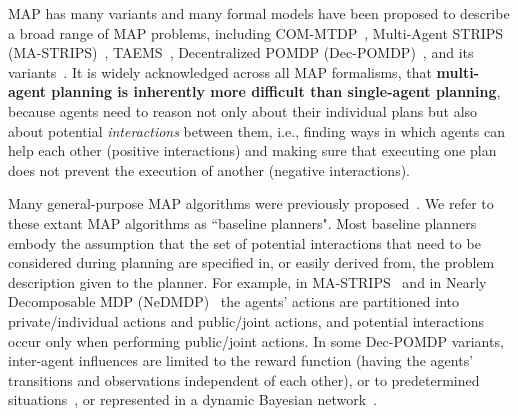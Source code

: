 \documentclass[11pt]{article}
\begin{document}
MAP has many variants and many formal models have been proposed to describe a broad range of MAP problems, including COM-MTDP~\cite{pynadath2002communicative}, Multi-Agent STRIPS (MA-STRIPS)~\cite{brafman2013complexity}, TAEMS~\cite{Horling-182,lesser2004evolution}, Decentralized POMDP (Dec-POMDP)~\cite{bernstein2002complexity}, and its variants~\cite{becker2004decentralized,roth2007exploiting,oliehoek2012influenceBased}. It is widely acknowledged across all MAP formalisms, that {\bf multi-agent planning is inherently more difficult than single-agent planning}, because agents need to reason not only about their individual plans but also about potential {\em interactions} between them, i.e., finding ways in which agents can help each other (positive interactions) and making sure that executing one plan does not prevent the execution of another (negative interactions).


Many general-purpose MAP algorithms were previously proposed~\cite{torreno2014fmap,nair2005networked,witwicki2010influence,spaan2011scaling,oliehoek2012influenceBased,wu2013monte,dibangoye2014exploiting,nissim2014distributed}. We refer to these extant MAP algorithms as ``baseline planners". 
Most baseline planners embody the assumption that the set of potential interactions that need to be considered during planning are specified in, or easily derived from, the problem description given to the planner. For example, in MA-STRIPS~\cite{brafman2013complexity} and in Nearly Decomposable MDP (NeDMDP)~\cite{kamar2013modeling} the agents' actions are partitioned into private/individual actions and public/joint actions, and potential interactions occur only when performing public/joint actions. In some Dec-POMDP variants, inter-agent influences are 
limited to the reward function (having the agents' transitions and observations independent of each other), or to predetermined situations~\cite{varakantham2009exploiting,melo2011decentralized}, or 
represented in a dynamic Bayesian network~\cite{nair2005networked,witwicki2010influence,oliehoek2012influenceBased}. 
\end{document}
